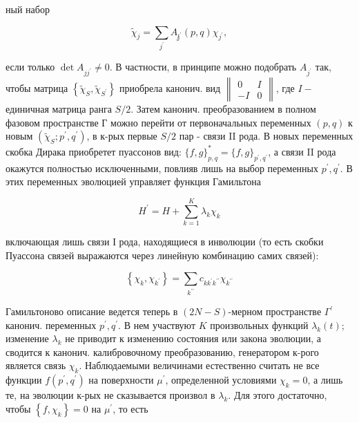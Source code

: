 \documentclass[10pt]{article}
\begin{document}
ный набор



\[

\tilde{\chi}_{j}=\sum_{j^{\prime}} A_{\not j^{\prime}}(p, q) \chi_{j^{\prime}},

\]



если только $\operatorname{det} A_{j j^{\prime}} \neq 0$. В частности, в принципе можно подобрать $A_{j^{\prime}}$ так, чтобы матрица $\left\{\tilde{\chi}_{S}, \tilde{\chi}_{S^{\prime}}\right\}$ приобрела канонич. вид $\left\|\begin{array}{cc}0 & I \\ -I & 0\end{array}\right\|$, где $I-$ единичная матрица ранга $S / 2$. Затем канонич. преобразованием в полном фазовом пространстве Г можно перейти от первоначальных переменных $(p, q)$ к новым $\left(\tilde{\chi}_{S} ; p^{\prime}, q^{\prime}\right)$, в к-рых первые $S / 2$ пар - связи II рода. В новых переменных скобка Дирака приобретет пуассонов вид: $\{f, g\}_{p, q}^{*}=\{f, g\}_{p^{\prime}, q^{\prime}}$, а связи II рода окажутся полностью исключенными, повлияв лишь на выбор переменных $p^{\prime}, q^{\prime}$. В этих переменных эволюцией управляет функция Гамильтона



\[

H^{\prime}=H+\sum_{k=1}^{K} \lambda_{k} \chi_{k}

\]



включающая лишь связи І рода, находящиеся в инволюции (то есть скобки Пуассона связей выражаются через линейную комбинацию самих связей):



\[

\left\{\chi_{k}, \chi_{k^{\prime}}\right\}=\sum_{k^{\prime \prime}} c_{k k^{\prime} k^{\prime \prime}} \chi_{k^{\prime \prime}}

\]



Гамильтоново описание ведется теперь в $(2 N-S)$-мерном пространстве $\Gamma^{\prime}$ канонич. переменных $p^{\prime}, q^{\prime}$. В нем участвуют $K$ произвольных функций $\lambda_{k}(t)$; изменение $\lambda_{k}$ не приводит к изменению состояния или закона эволюции, а сводится к канонич. калибровочному преобразованию, генератором к-рого является связь $\chi_{k}$. Наблюдаемыми величинами естественно считать не все функции $f\left(p^{\prime}, q^{\prime}\right)$ на поверхности $\mathscr{\mu}^{\prime}$, определенной условиями $\chi_{k}=0$, а лишь те, на эволюции к-рых не сказывается произвол в $\lambda_{k}$. Для этого достаточно, чтобы $\left\{f, \chi_{k}\right\}=0$ на $\mu^{\prime}$, то есть
\end{document}
